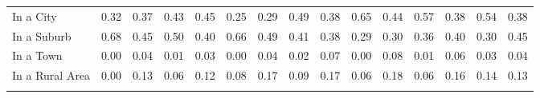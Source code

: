 \begin{tabular*}{\linewidth}{@{\extracolsep{\fill} } lcccccccccccccc}
\hspace{0.2cm}In a City&0.32&0.37&0.43&0.45&0.25&0.29&0.49&0.38&0.65&0.44&0.57&0.38&0.54&0.38\\%
\hspace{0.2cm}In a Suburb&0.68&0.45&0.50&0.40&0.66&0.49&0.41&0.38&0.29&0.30&0.36&0.40&0.30&0.45\\%
\hspace{0.2cm}In a Town&0.00&0.04&0.01&0.03&0.00&0.04&0.02&0.07&0.00&0.08&0.01&0.06&0.03&0.04\\%
\hspace{0.2cm}In a Rural Area&0.00&0.13&0.06&0.12&0.08&0.17&0.09&0.17&0.06&0.18&0.06&0.16&0.14&0.13\\%
&&&&&&&&&&&&&&\\%
\hline%
\end{tabular*}